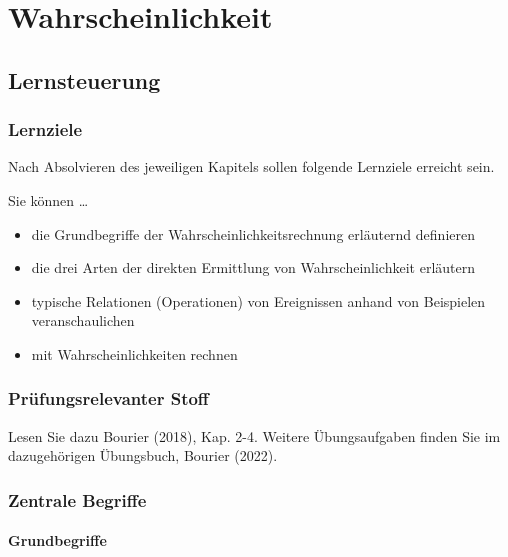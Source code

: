 \documentclass[
  a4paper,
  DIV=11]{scrreprt}
\providecommand{\tightlist}{%
  \setlength{\itemsep}{0pt}\setlength{\parskip}{0pt}}\usepackage{longtable,booktabs,array}
\theoremstyle{definition}
\theoremstyle{remark}
\begin{document}
\hypertarget{wahrscheinlichkeit}{%
\chapter{Wahrscheinlichkeit}\label{wahrscheinlichkeit}}

\hypertarget{lernsteuerung-1}{%
\section{Lernsteuerung}\label{lernsteuerung-1}}

\hypertarget{lernziele-2}{%
\subsection{Lernziele}\label{lernziele-2}}

Nach Absolvieren des jeweiligen Kapitels sollen folgende Lernziele
erreicht sein.

Sie können \ldots{}

\begin{itemize}
\tightlist
\item
  die Grundbegriffe der Wahrscheinlichkeitsrechnung erläuternd
  definieren
\item
  die drei Arten der direkten Ermittlung von Wahrscheinlichkeit
  erläutern
\item
  typische Relationen (Operationen) von Ereignissen anhand von
  Beispielen veranschaulichen
\item
  mit Wahrscheinlichkeiten rechnen
\end{itemize}

\hypertarget{pruxfcfungsrelevanter-stoff}{%
\subsection{Prüfungsrelevanter
Stoff}\label{pruxfcfungsrelevanter-stoff}}

Lesen Sie dazu Bourier (2018), Kap. 2-4. Weitere Übungsaufgaben finden
Sie im dazugehörigen Übungsbuch, Bourier (2022).

\hypertarget{zentrale-begriffe}{%
\subsection{Zentrale Begriffe}\label{zentrale-begriffe}}

\hypertarget{grundbegriffe}{%
\subsubsection{Grundbegriffe}\label{grundbegriffe}}
\end{document}
